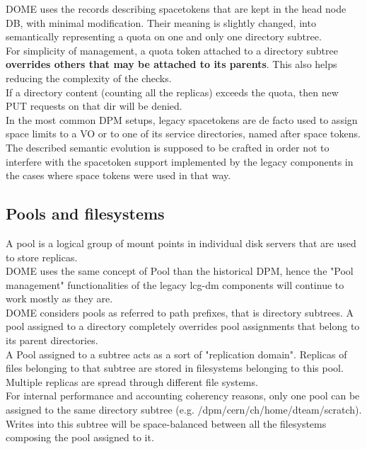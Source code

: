 \documentclass[a4paper,10pt]{scrreprt}
\begin{document}
DOME uses the records describing spacetokens that are kept in the head node DB, with minimal modification. Their meaning is slightly changed,
into semantically representing a quota on one and only one directory subtree.\\

For simplicity of management, a quota token attached to a directory subtree \textbf{overrides others that may be attached to its parents}. This also helps reducing the complexity of the checks.\\
If a directory content (counting all the replicas) exceeds the quota, then new PUT requests on that dir will be denied.\\

In the most common DPM setups, legacy spacetokens are de facto used to assign space limits to a VO or to one of its service directories, named after space tokens.\\
The described semantic evolution is supposed to be crafted in order not to interfere with the spacetoken support implemented by the legacy components in the cases
where space tokens were used in that way.


\subsection{Pools and filesystems}
A pool is a logical group of mount points in individual disk servers that are used to store replicas.\\

DOME uses the same concept of Pool than the historical DPM, hence the "Pool management" functionalities
of the legacy lcg-dm components will continue to work mostly as they are.\\

DOME considers pools as referred to path prefixes, that is directory subtrees. A pool assigned to a directory
completely overrides pool assignments that belong to its parent directories.\\

A Pool assigned to a subtree acts as a sort of "replication domain". Replicas of files belonging to that subtree
are stored in filesystems belonging to this pool. Multiple replicas are spread through different file systems.\\

For internal performance and accounting coherency reasons, only one pool can be assigned to the same directory subtree (e.g. /dpm/cern/ch/home/dteam/scratch).
Writes into this subtree will be space-balanced between all the filesystems composing the pool assigned to it.\\
\end{document}
